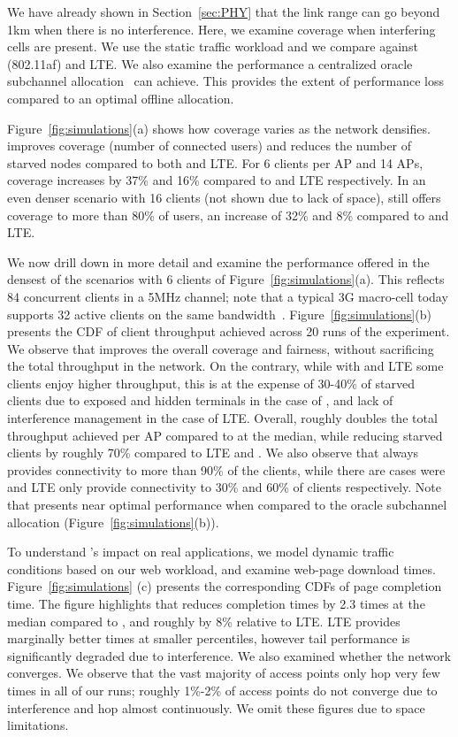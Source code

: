 \vskip 2pt
We have already shown in Section~\ref{sec:PHY} that the link range can go beyond 1km when there is no interference. 
Here, we examine coverage when interfering cells are present. 
We use the static traffic workload and we compare \cf against \wf (802.11af) and LTE.
We also examine the performance a centralized oracle subchannel allocation~\cite{fermi} can achieve.
This provides the extent of performance loss compared to an optimal offline allocation.

Figure~\ref{fig:simulations}(a) shows how coverage varies as the network densifies. 
\cf improves coverage (number of connected users) 
and reduces the number of starved nodes compared to both \cf and LTE. 
For 6 clients per AP and 14 APs, coverage increases by 37\% and 16\% compared to \wf and LTE respectively. 
In an even denser scenario with 16 clients (not shown due to lack of space), 
\cf still offers coverage to more than 80\% of users, an increase of 32\% and 8\% compared to \wf and LTE. 

We now drill down in more detail and examine the performance offered in the densest of the scenarios with 6 clients of Figure~\ref{fig:simulations}(a).
This reflects 84 concurrent clients in a 5MHz channel; note that a typical 3G macro-cell today supports 32 active clients on the same bandwidth~\cite{quora}. 
Figure~\ref{fig:simulations}(b) presents the CDF of client throughput achieved across 20 runs of the experiment.
We observe that \cf improves the overall coverage and fairness, without sacrificing the total throughput in the network.
On the contrary, while with \wf and LTE some clients enjoy higher throughput, this is at the expense of 30-40\% of starved clients due to 
exposed and hidden terminals in the case of \wf, and lack of interference management in the case of LTE. 
Overall, \cf roughly doubles the total throughput achieved per AP compared to \wf at the median, while 
reducing starved clients by roughly 70\% compared to LTE and \wf. 
We also observe that \cf always provides connectivity to more than 90\% of the clients,
while there are cases were \wf and LTE only provide connectivity to 30\% and 60\% of clients respectively.
Note that \cf presents near optimal performance when compared to 
the oracle subchannel allocation (Figure~\ref{fig:simulations}(b)). 



To understand \cf's impact on real applications, we model dynamic traffic conditions based
on our web workload, and examine web-page download times. 
Figure~\ref{fig:simulations} (c) presents the corresponding CDFs of page completion time. The figure
highlights that \cf reduces completion times by 2.3 times at the median compared to \wf, 
and roughly by 8\% relative to LTE. LTE provides marginally better times at smaller percentiles, however
tail performance is significantly degraded due to interference. We also examined whether the network converges. 
We observe that the vast majority of access points only hop very few times in all of our runs; roughly 
1\%-2\% of access points do not converge due to interference and hop almost continuously. 
We omit these figures due to space limitations.

